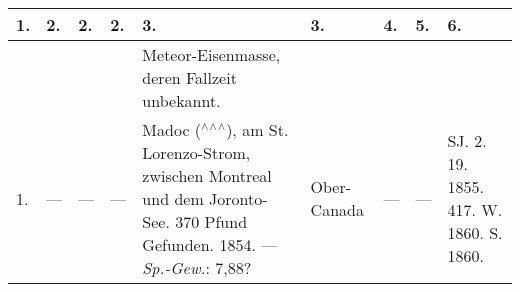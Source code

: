\documentclass[a4paper, 8pt, oneside, polutonikogreek, german]{article}
\begin{document}
\subsubsection{}
\begin{table}[H]
    \centering
    \swabfamily
    \footnotesize
    \begin{longtable}{|p{3mm}|p{4mm}|p{11mm}|p{7mm}|p{22mm}|p{14mm}|p{10mm}|p{10mm}|p{13mm}|}
    \hline
        1. & 2. & 2. & 2. & 3. & 3. & 4. & 5. & 6. \\ \hline
          &   &   &   & Meteor-Eisenmasse, deren Fallzeit unbekannt. &   &   &   &   \\ \hline
        1. & --- & --- & --- & Madoc ($^\wedge$$^\wedge$$^\wedge$), am St. Lorenzo-Strom, zwischen Montreal und dem Joronto-See. 370 Pfund Gefunden. 1854. --- \emph{Sp.-Gew.}: 7,88? & Ober-Canada & --- & --- & SJ. 2. 19. 1855. 417. W. 1860. S. 1860. \\ \hline
    \end{longtable}
\end{table}
\end{document}
